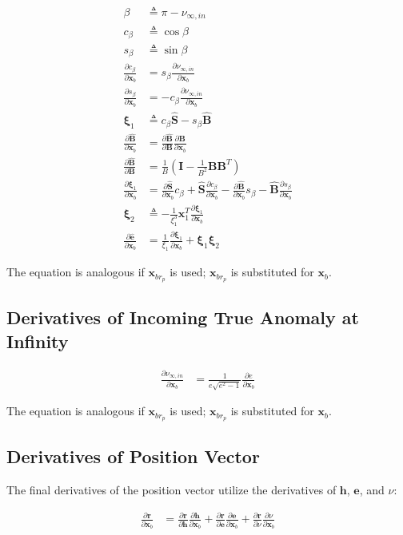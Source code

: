 \documentclass[]{article}
\newcommand{\vb}[1]{\bm{#1}} %
\newcommand{\vbh}[1]{\hat{\bm{#1}}} %
\newcommand{\pd}[2]{\frac{\partial #1}{\partial #2}} %
\newcommand{\xb}[0]{\vb{x}_b}
\newcommand{\xbrp}[0]{\vb{x}_{br_p}}
\begin{document}
\begin{align}
	\beta &\triangleq \pi - \nu_{\infty,in} \\
	c_\beta &\triangleq \cos \beta \\
	s_\beta &\triangleq \sin \beta \\
	\pd{c_\beta}{\xb} &= s_\beta \pd{\nu_{\infty,in}}{\xb} \\
	\pd{s_\beta}{\xb} &= -c_\beta \pd{\nu_{\infty,in}}{\xb} \\
	\vb{\xi}_1 &\triangleq c_\beta \vbh{S} - s_\beta \vbh{B} \\
	\pd{\vbh{B}}{\xb} &= \pd{\vbh{B}}{\vb{B}} \pd{\vb{B}}{\xb} \\
	\pd{\vbh{B}}{\vb{B}} &= \frac{1}{B} \left( \vb{I} - \frac{1}{B^2} \vb{B} \vb{B}^T \right) \\
	\pd{\vb{\xi}_1}{\xb} &= \pd{\vbh{S}}{\xb} c_\beta + \vbh{S} \pd{c_\beta}{\xb}  - \pd{\vbh{B}}{\xb} s_\beta - \vbh{B} \pd{s_\beta}{\xb}  \\
	\vb{\xi}_2 &\triangleq -\frac{1}{\xi_1^3} \vb{x}_1^T \pd{\vb{\xi}_1}{\xb} \\
	\label{eq:d_ehat_in_d_xb}
	\pd{\vbh{e}}{\xb} &= \frac{1}{\xi_1} \pd{\vb{\xi}_1}{\xb} + \vb{\xi}_1 \vb{\xi}_2
\end{align}

The equation is analogous if $\xbrp$ is used; $\xbrp$ is substituted for $\xb$.

\subsection{Derivatives of Incoming True Anomaly at Infinity}

\begin{align}
	\label{eq:d_nuinf_in_d_xb}
	\pd{\nu_{\infty,in}}{\xb} &= \frac{1}{e \sqrt{e^2 - 1}} \pd{e}{\xb}
\end{align}

The equation is analogous if $\xbrp$ is used; $\xbrp$ is substituted for $\xb$.

\subsection{Derivatives of Position Vector}

The final derivatives of the position vector utilize the derivatives of $\vb{h}$, $\vb{e}$, and $\nu$:

\begin{align}
\pd{\vb{r}}{\xb} &= \pd{\vb{r}}{\vb{h}} \pd{\vb{h}}{\xb} + \pd{\vb{r}}{\vb{e}} \pd{\vb{e}}{\xb} + \pd{\vb{r}}{\nu} \pd{\nu}{\xb}
\end{align}
\end{document}
